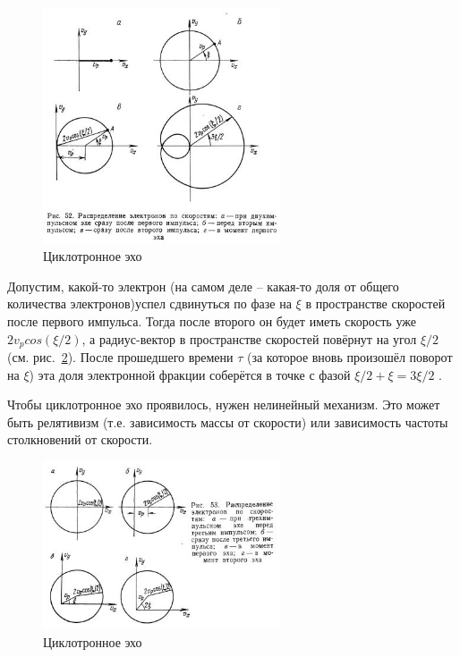 \documentclass[10pt, a4paper]{article}
\begin{document}
\begin{figure}[ht]
	\begin{center}
		\includegraphics[width=70mm]{Echo_2_18.3.JPG}
	\end{center}
	\caption{Циклотронное эхо}
	\label{fig:c_echo}
\end{figure}

Допустим, какой-то электрон (на самом деле -- какая-то доля от общего количества электронов)успел сдвинуться по фазе на $\xi$ в пространстве скоростей после первого импульса. Тогда после второго он будет иметь скорость уже $2 v_p cos(\xi /2)$, а радиус-вектор в пространстве скоростей повёрнут на угол $\xi /2$ (см. рис.~\ref{fig:c_echo_2}). После прошедшего времени $\tau$ (за которое вновь произошёл поворот на $\xi$) эта доля электронной фракции соберётся в точке с фазой $\xi /2 + \xi = 3\xi/2$ .

Чтобы циклотронное эхо проявилось, нужен нелинейный механизм. Это может быть релятивизм (т.е. зависимость массы от скорости) или зависимость частоты столкновений от скорости. 

\begin{figure}[ht]
	\begin{center}
		\includegraphics[width=70mm]{Echo_3_18.3.JPG}
	\end{center}
	\caption{Циклотронное эхо}
	\label{fig:c_echo_2}
\end{figure}
\end{document}
